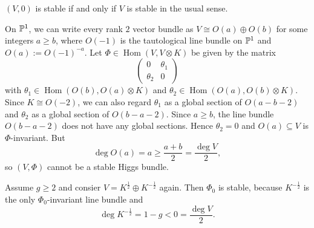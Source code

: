 \documentclass[A4paper, 12pt, british, reqno]{amsart}
\DeclareMathOperator{\Hom}{Hom}
\newcommand{\ot}{\otimes}
\newcommand{\op}{\oplus}
\begin{document}
\begin{rem}
    $(V,0)$ is stable if and only if $V$ is stable in the usual sense.
\end{rem}

\begin{exa}
    On $\P^{1}$, we can write every rank $2$ vector bundle as $V\cong O(a)\op O(b)$ for some integers $a\geqslant b$, where $O(-1)$ is the tautological line bundle on $\P^{1}$ and $O(a):=O(-1)^{-a}$.
    Let $\Phi\in \Hom(V,V\ot K)$ be given by the matrix
    \[
	\begin{pmatrix}
	    0 & \theta_{1} \\
	    \theta_{2} & 0
	\end{pmatrix}
    \]
    with $\theta_{1}\in \Hom(O(b),O(a)\ot K)$ and $\theta_{2}\in \Hom(O(a),O(b)\ot K)$.
    Since $K\cong O(-2)$, we can also regard $\theta_{1}$ as a global section of $O(a-b-2)$ and $\theta_{2}$ as a global section of $O(b-a-2)$.
    Since $a\geqslant b$, the line bundle $O(b-a-2)$ does not have any global sections.
    Hence $\theta_{2}=0$ and $O(a)\subseteq V$ is $\Phi$-invariant.
    But
    \[ \deg{O(a)}=a\geqslant \frac{a+b}{2}=\frac{\deg{V}}{2}, \]
    so $(V,\Phi)$ cannot be a stable Higgs bundle.
\end{exa}

\begin{exa}
    Assume $g\geqslant 2$ and consier $V=K^{\frac{1}{2}}\op K^{-\frac{1}{2}}$ again.
    Then $\Phi_{0}$ is stable, because $K^{-\frac{1}{2}}$ is the only $\Phi_{0}$-invariant line bundle and
    \[ \deg{K^{-\frac{1}{2}}}=1-g<0=\frac{\deg{V}}{2}. \]
\end{exa}
\end{document}

